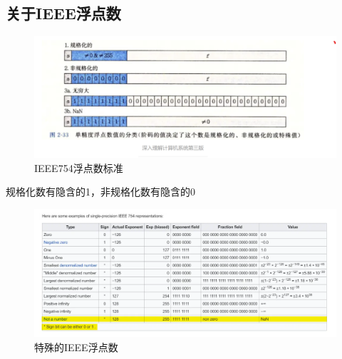 \documentclass[12pt, a4paper, oneside]{ctexart}
\begin{document}
\subsection{关于IEEE浮点数}
\begin{figure}[htbp]
    \centering
    \includegraphics[scale=0.6]{IEEE754.png}
    \caption{IEEE754浮点数标准}
\end{figure}
规格化数有隐含的1，非规格化数有隐含的0
\begin{figure}[htbp]
    \centering
    \includegraphics[scale=0.6]{IEEEnumber.png}
    \caption{特殊的IEEE浮点数}
\end{figure}
\end{document}
